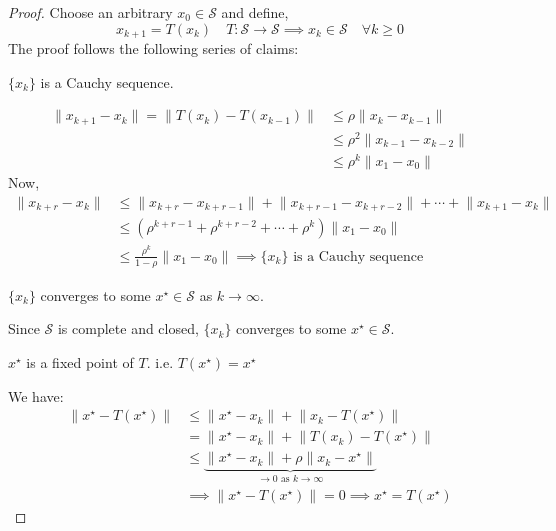 \begin{proof}
    Choose an arbitrary \(x_0 \in \mathcal{S}\) and define,
    \[
        x_{k+1} = T(x_k) \quad T : \mathcal{S} \to \mathcal{S} \implies x_k \in \mathcal{S} \quad
         \forall k \geq 0
    \]
    The proof follows the following series of claims:
    \begin{claims}
        \(\{x_k\}\) is a Cauchy sequence.
    \end{claims}
    \[
        \begin{aligned}
            \lVert x_{k+1} - x_k \rVert = \lVert T(x_k) - T(x_{k-1}) \rVert &\leq \rho \lVert x_k - x_{k-1} \rVert\\
            &\leq \rho^2 \lVert x_{k-1} - x_{k-2} \rVert \\
            &\leq \rho^k \lVert x_1 - x_0 \rVert
        \end{aligned}
    \]
    Now, 
    \[
        \begin{aligned}
            \lVert x_{k+r} - x_k \rVert &\leq \lVert x_{k+r} - x_{k+r-1} \rVert +
             \lVert x_{k+r-1} - x_{k+r-2} \rVert + \cdots + \lVert x_{k+1} - x_k \rVert \\
             & \leq \left( 
                    \rho^{k+r-1} + \rho^{k+r-2} + \cdots + \rho^k
              \right) 
                \lVert x_1 - x_0 \rVert \\
                & \leq \frac{\rho^k}{1 - \rho} \lVert x_1 - x_0 \rVert \implies \{x_k\} \text{ is a Cauchy sequence}
        \end{aligned}
    \]
    \begin{claims}
        \(\{x_k\}\) converges to some \(x^{\star} \in \mathcal{S}\) as \(k \to \infty\).
    \end{claims}
    Since \(\mathcal{S}\) is complete and closed, \(\{x_k\}\) converges to some \(x^{\star} \in \mathcal{S}\).
    \begin{claims}
        \(x^{\star} \) is a fixed point of \(T\). i.e. \(T(x^{\star}) = x^{\star}\)
    \end{claims}
    We have:
    \[
        \begin{aligned}
            \lVert x^{\star} - T(x^{\star}) \rVert &\leq  \lVert x^{\star} - x_k \rVert + \lVert x_k - T(x^{\star}) \rVert \\
            & = \lVert x^{\star} - x_k \rVert + \lVert T(x_k) - T(x^{\star}) \rVert \\
            &\leq \underbrace{ \lVert x^{\star} - x_k \rVert + \rho \lVert x_k - x^{\star} \rVert}_{\to 0 \text{ as } k \to \infty} \\
            & \implies \lVert x^{\star} - T(x^{\star}) \rVert = 0 \implies x^{\star} = T(x^{\star})
        \end{aligned}
    \]


\end{proof}
